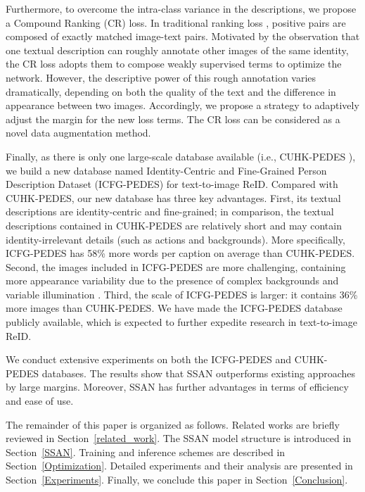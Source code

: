 \documentclass[journal]{IEEEtran}
\begin{document}
Furthermore, to overcome the intra-class variance in the descriptions, we propose a Compound Ranking (CR) loss. In traditional ranking loss \cite{faghri2017vse++}, positive pairs are composed of exactly matched image-text pairs. Motivated by the observation that one textual description can roughly annotate other images of the same identity, the CR loss adopts them to compose weakly supervised terms to optimize the network. However, the descriptive power of this rough annotation varies dramatically, depending on both the quality of the text and the difference in appearance between two images. Accordingly, we propose a strategy to adaptively adjust the margin for the new loss terms. The CR loss can be considered as a novel data augmentation method.

Finally, as there is only one large-scale database available (i.e., CUHK-PEDES \cite{li2017person}), we build a new database named Identity-Centric and Fine-Grained Person Description Dataset (ICFG-PEDES) for text-to-image ReID. Compared with CUHK-PEDES, our new database has three key advantages. First, its textual descriptions are identity-centric and fine-grained; in comparison, the textual descriptions contained in CUHK-PEDES are relatively short and may contain identity-irrelevant details (such as actions and backgrounds). More specifically, ICFG-PEDES has 58\% more words per caption on average than CUHK-PEDES. Second, the images included in ICFG-PEDES are more challenging, containing more appearance variability due to the presence of complex backgrounds and variable illumination \cite{wei2018person}. Third, the scale of ICFG-PEDES is larger: it contains 36\% more images than CUHK-PEDES.
We have made the ICFG-PEDES database publicly available, which is expected to further expedite research in text-to-image ReID.

We conduct extensive experiments on both the ICFG-PEDES and CUHK-PEDES databases. The results show that SSAN outperforms existing approaches by large margins. Moreover, SSAN has further advantages in terms of efficiency and ease of use.

The remainder of this paper is organized as follows. Related works are briefly reviewed in Section~\ref{related_work}. The SSAN model structure is introduced in Section~\ref{SSAN}.
Training and inference schemes are described in Section~\ref{Optimization}. Detailed experiments and their analysis are presented in Section~\ref{Experiments}. Finally, we conclude this paper in Section~\ref{Conclusion}.
\end{document}
